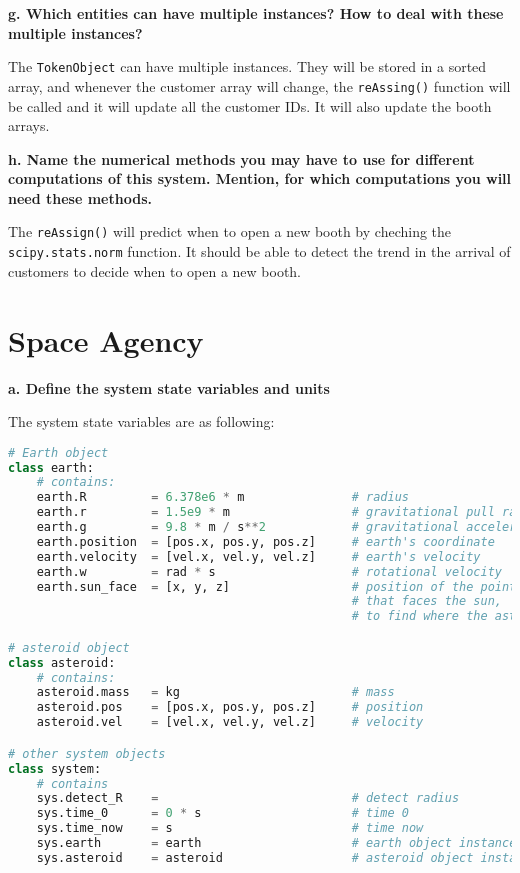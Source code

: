 \documentclass[article, 11pt, a4paper]{memoir}
\begin{document}
\textbf{g. Which entities can have multiple instances? How to deal with these multiple
instances?}
\vspace{1em}

\begin{solution}
    [g]
    The \texttt{TokenObject} can have multiple instances. They will be stored in a sorted
    array, and whenever the customer array will change, the \texttt{reAssing()} function
    will be called and it will update all the customer IDs. It will also update the booth
    arrays.
\end{solution}


\textbf{h. Name the numerical methods you may have to use for different computations of
this system. Mention, for which computations you will need these methods.}
\vspace{1em}

\begin{solution}
    [h]
    The \texttt{reAssign()} will predict when to open a new booth by cheching the
    \texttt{scipy.stats.norm} function. It should be able to detect the trend in the
    arrival of customers to decide when to open a new booth.
\end{solution}

\chapter{Space Agency}

\textbf{a. Define the system state variables and units}
\vspace{1em}

\begin{solution}
    [a]
    The system state variables are as following:
\begin{lstlisting}[language=Python]
# Earth object
class earth:
    # contains:
    earth.R         = 6.378e6 * m               # radius
    earth.r         = 1.5e9 * m                 # gravitational pull range
    earth.g         = 9.8 * m / s**2            # gravitational acceleration
    earth.position  = [pos.x, pos.y, pos.z]     # earth's coordinate
    earth.velocity  = [vel.x, vel.y, vel.z]     # earth's velocity
    earth.w         = rad * s                   # rotational velocity
    earth.sun_face  = [x, y, z]                 # position of the point on earth 
                                                # that faces the sun,
                                                # to find where the asteroid hits

# asteroid object
class asteroid:
    # contains:
    asteroid.mass   = kg                        # mass
    asteroid.pos    = [pos.x, pos.y, pos.z]     # position
    asteroid.vel    = [vel.x, vel.y, vel.z]     # velocity

# other system objects
class system:
    # contains
    sys.detect_R    =                           # detect radius
    sys.time_0      = 0 * s                     # time 0
    sys.time_now    = s                         # time now             
    sys.earth       = earth                     # earth object instance
    sys.asteroid    = asteroid                  # asteroid object instance
\end{lstlisting}
\end{solution}
\end{document}
